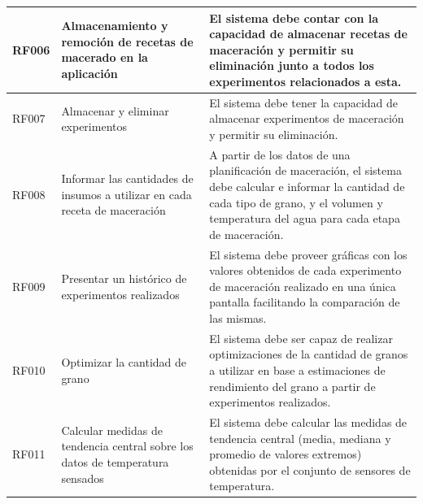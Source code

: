 \begin{longtable}[H]{|p{1.4cm}|p{3.1cm}|p{9.5cm}|}
        RF006 & Almacenamiento y remoción de recetas de macerado en la aplicación & El sistema debe contar con la capacidad de almacenar recetas de maceración y permitir su eliminación junto a  todos los experimentos relacionados a esta.
        \\\hline
        
        RF007 & Almacenar y eliminar experimentos  & El sistema debe tener la capacidad de almacenar experimentos de maceración y permitir su eliminación.
        \\\hline
        
        RF008 & Informar las cantidades de insumos a utilizar en cada receta de maceración  & A partir de los datos de una planificación de maceración, el sistema debe calcular e informar la cantidad de cada tipo de grano, y el volumen y temperatura del agua para cada etapa de maceración.
        \\\hline
        
        RF009 & Presentar un histórico de experimentos realizados & El sistema debe proveer gráficas con los valores obtenidos de cada experimento de maceración realizado en una única pantalla facilitando la comparación de las mismas.
        \\\hline
        
        RF010 & Optimizar la cantidad de grano & El sistema debe ser capaz de realizar optimizaciones de la cantidad de granos a utilizar en base a estimaciones de rendimiento del grano a partir de experimentos realizados.
         \\\hline
        RF011 & Calcular medidas de tendencia central sobre los datos de temperatura sensados & El sistema debe calcular las medidas de tendencia central (media, mediana y promedio de valores extremos) obtenidas por el conjunto de sensores de temperatura.
        \\\hline
 \end{longtable}
   
    
 
 
 
